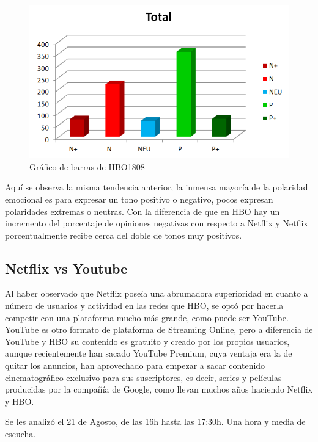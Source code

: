 \begin{figure}[H]
	\centering
	\includegraphics[scale=1]{imagenes/barrasHBO1808.PNG}
	\caption{Gráfico de barras de HBO1808}
	\label{fig:barrasHBO1808}
\end{figure}


Aquí se observa la misma tendencia anterior, la inmensa mayoría de la polaridad emocional es para expresar un tono positivo o negativo, pocos expresan polaridades extremas o neutras. Con la diferencia de que en HBO hay un incremento del porcentaje de opiniones negativas con respecto a Netflix y Netflix porcentualmente recibe cerca del doble de tonos muy positivos. 


\subsection{Netflix vs Youtube}

Al haber observado que Netflix poseía una abrumadora superioridad en cuanto a número de usuarios y actividad en las redes que HBO, se optó por hacerla competir con una plataforma mucho más grande, como puede ser YouTube. YouTube es otro formato de plataforma de Streaming Online, pero a diferencia de YouTube y HBO su contenido es gratuito y creado por los propios usuarios, aunque recientemente han sacado YouTube Premium, cuya ventaja era la de quitar los anuncios, han aprovechado para empezar a sacar contenido cinematográfico exclusivo para sus suscriptores, es decir, series y películas producidas por la compañía de Google, como llevan muchos años haciendo Netflix y HBO. 

Se les analizó el 21 de Agosto, de las 16h hasta las 17:30h. Una hora y media de escucha.



